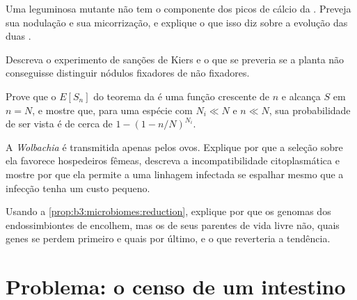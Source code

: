 \begin{exercise}[$\star\star$]\label{exo:b3:microbiomes:8}
Uma leguminosa mutante não tem o componente dos picos de cálcio da . Preveja sua nodulação e sua micorrização, e explique
o que isso diz sobre a evolução das duas .
\end{exercise}

\begin{exercise}[$\star\star$]\label{exo:b3:microbiomes:9}
Descreva o experimento de sanções de Kiers e o que se preveria se a
planta não conseguisse distinguir nódulos fixadores de não fixadores.
\end{exercise}

\begin{exercise}[$\star\star\star$]\label{exo:b3:microbiomes:10}
Prove que o $E[S_{n}]$ do teorema da  é uma função crescente
de $n$ e alcança $S$ em $n = N$, e mostre que, para uma espécie com
$N_{i} \ll N$ e $n \ll N$, sua probabilidade de ser vista é de cerca de
$1 - (1 - n/N)^{N_{i}}$.
\end{exercise}

\begin{exercise}[$\star\star\star$]\label{exo:b3:microbiomes:11}
A \emph{Wolbachia} é transmitida apenas pelos ovos. Explique por que a
seleção sobre ela favorece hospedeiros fêmeas, descreva a
incompatibilidade citoplasmática e mostre por que ela permite a uma
linhagem infectada se espalhar mesmo que a infecção tenha um custo
pequeno.
\end{exercise}

\begin{exercise}[$\star\star\star$]\label{exo:b3:microbiomes:12}
Usando a \cref{prop:b3:microbiomes:reduction}, explique por que os
genomas dos endossimbiontes de  encolhem, mas os de
seus parentes de vida livre não, quais genes se perdem primeiro e
quais por último, e o que reverteria a tendência.
\end{exercise}

\section{Problema: o censo de um intestino}

